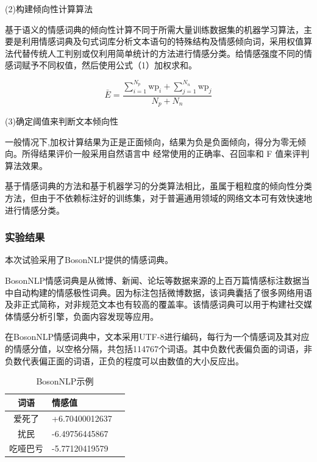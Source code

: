 \documentclass[hyperref,a4paper,UTF8]{ctexart}
\begin{document}
(2)构建倾向性计算算法


基于语义的情感词典的倾向性计算不同于所需大量训练数据集的机器学习算法，主要是利用情感词典及句式词库分析文本语句的特殊结构及情感倾向词，采用权值算法代替传统人工判别或仅利用简单统计的方法进行情感分类。给情感强度不同的情感词赋予不同权值，然后使用公式（1）加权求和。

 \begin{equation}
\bar{E}=\frac{\sum_{i=1}^{N_p} \mathrm{wp}_i+\sum_{j=1}^{N_n} \mathrm{wp}_j}{N_p+N_n}
\end{equation}


(3)确定阈值来判断文本倾向性

一般情况下,加权计算结果为正是正面倾向，结果为负是负面倾向，得分为零无倾向。所得结果评价一般采用自然语言中 经常使用的正确率、召回率和 F 值来评判算法效果。


基于情感词典的方法和基于机器学习的分类算法相比，虽属于粗粒度的倾向性分类方法，但由于不依赖标注好的训练集，对于普遍通用领域的网络文本可有效快速地进行情感分类。

\subsubsection{实验结果}

本次试验采用了BosonNLP提供的情感词典。


BosonNLP情感词典是从微博、新闻、论坛等数据来源的上百万篇情感标注数据当中自动构建的情感极性词典。因为标注包括微博数据，该词典囊括了很多网络用语及非正式简称，对非规范文本也有较高的覆盖率。该情感词典可以用于构建社交媒体情感分析引擎，负面内容发现等应用。


在BosonNLP情感词典中，文本采用UTF-8进行编码，每行为一个情感词及其对应的情感分值，以空格分隔，共包括114767个词语。其中负数代表偏负面的词语，非负数代表偏正面的词语，正负的程度可以由数值的大小反应出。

\begin{table}[ht]
    \centering
    \begin{tabular}{c|lr} %
        \toprule
        词语 & 情感值\\
        \midrule
        爱死了  & +6.70400012637\\
        \hline  %
        扰民  & -6.49756445867 \\
        \hline  %
        吃哑巴亏  & -5.77120419579 \\
        \bottomrule
    \end{tabular}
    \caption{BosonNLP示例}
    \label{tab:example}
\end{table}
\end{document}

